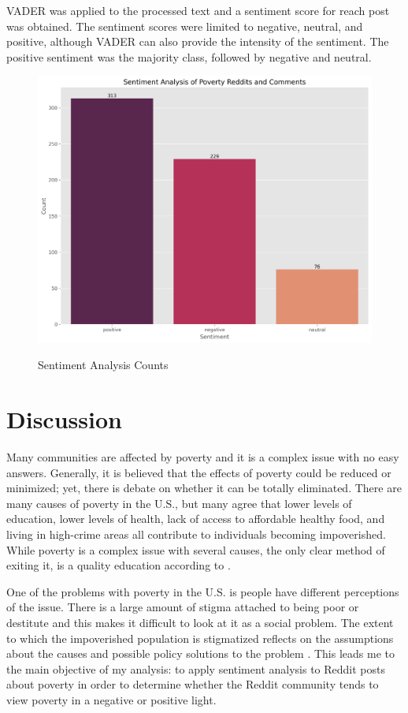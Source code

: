 \documentclass[stu,12pt,floatsintext]{apa7}
\begin{document}
\indent VADER was applied to the processed text and a sentiment score for reach post was obtained.  The sentiment scores were limited to negative, neutral, and positive, although VADER can also provide the intensity of the sentiment.  The positive sentiment was the majority class, followed by negative and neutral. 
\begin{figure}[H]
	\centering
	\caption{Sentiment Analysis Counts}
	\includegraphics[width=0.75\linewidth]{figures/sentimentAnalysisSimple.png}
	\label{fig:sentiment_analysis}
\end{figure}
\section{Discussion}
\indent Many communities are affected by poverty and it is a complex issue with no easy answers.  Generally, it is believed that the effects of poverty could be reduced or minimized; yet, there is debate on whether it can be totally eliminated.  There are many causes of poverty in the U.S., but many agree that lower levels of education, lower levels of health, lack of access to affordable healthy food, and living in high-crime areas all contribute to individuals becoming impoverished.  While poverty is a complex issue with several causes, the only clear method of exiting it, is a quality education according to \citet{tackie2021}.

\indent One of the problems with poverty in the U.S. is people have different perceptions of the issue.  There is a large amount of stigma attached to being poor or destitute and this makes it difficult to look at it as a social problem.  The extent to which the impoverished population is stigmatized reflects on the assumptions about the causes and possible policy solutions to the problem \citep{bowen2024}.  This leads me to the main objective of my analysis: to apply sentiment analysis to Reddit posts about poverty in order to determine whether the Reddit community tends to view poverty in a negative or positive light.
\end{document}
